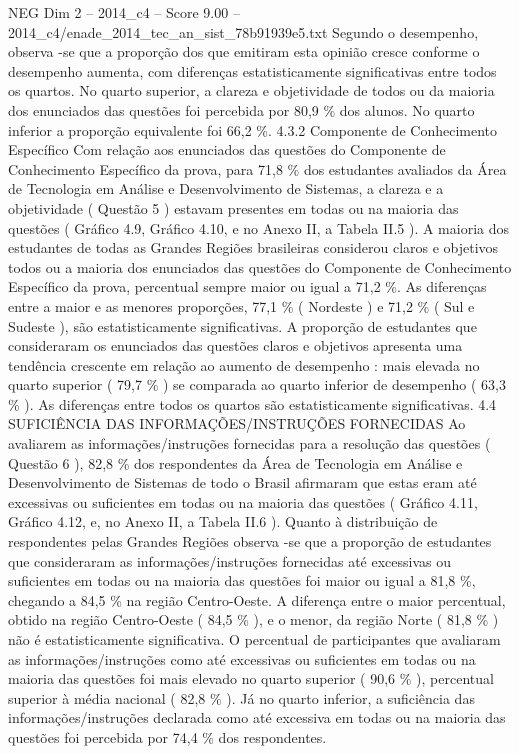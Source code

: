 \begin{textsample}{NEG Dim 2 – 2014\_c4 – Score 9.00 – 2014\_c4/enade\_2014\_tec\_an\_sist\_78b91939e5.txt}
Segundo o desempenho, observa -se que a proporção dos que emitiram esta opinião cresce conforme o desempenho aumenta, com diferenças estatisticamente significativas entre todos os quartos.
No quarto superior, a clareza e objetividade de todos ou da maioria dos enunciados das questões foi percebida por 80,9 \% dos alunos.
No quarto inferior a proporção equivalente foi 66,2 \%. 4.3.2 Componente de Conhecimento Específico Com relação aos enunciados das questões do Componente de Conhecimento Específico da prova, para 71,8 \% dos estudantes avaliados da Área de Tecnologia em Análise e Desenvolvimento de Sistemas, a clareza e a objetividade ( Questão 5 ) estavam presentes em todas ou na maioria das questões ( Gráfico 4.9, Gráfico 4.10, e no Anexo II, a Tabela II.5 ).
A maioria dos estudantes de todas as Grandes Regiões brasileiras considerou claros e objetivos todos ou a maioria dos enunciados das questões do Componente de Conhecimento Específico da prova, percentual sempre maior ou igual a 71,2 \%.
As diferenças entre a maior e as menores proporções, 77,1 \% ( Nordeste ) e 71,2 \% ( Sul e Sudeste ), são estatisticamente significativas.
A proporção de estudantes que consideraram os enunciados das questões claros e objetivos apresenta uma tendência crescente em relação ao aumento de desempenho : mais elevada no quarto superior ( 79,7 \% ) se comparada ao quarto inferior de desempenho ( 63,3 \% ).
As diferenças entre todos os quartos são estatisticamente significativas. 4.4 SUFICIÊNCIA DAS INFORMAÇÕES/INSTRUÇÕES FORNECIDAS Ao avaliarem as informações/instruções fornecidas para a resolução das questões ( Questão 6 ), 82,8 \% dos respondentes da Área de Tecnologia em Análise e Desenvolvimento de Sistemas de todo o Brasil afirmaram que estas eram até excessivas ou suficientes em todas ou na maioria das questões ( Gráfico 4.11, Gráfico 4.12, e, no Anexo II, a Tabela II.6 ).
Quanto à distribuição de respondentes pelas Grandes Regiões observa -se que a proporção de estudantes que consideraram as informações/instruções fornecidas até excessivas ou suficientes em todas ou na maioria das questões foi maior ou igual a 81,8 \%, chegando a 84,5 \% na região Centro-Oeste.
A diferença entre o maior percentual, obtido na região Centro-Oeste ( 84,5 \% ), e o menor, da região Norte ( 81,8 \% ) não é estatisticamente significativa.
O percentual de participantes que avaliaram as informações/instruções como até excessivas ou suficientes em todas ou na maioria das questões foi mais elevado no quarto superior ( 90,6 \% ), percentual superior à média nacional ( 82,8 \% ).
Já no quarto inferior, a suficiência das informações/instruções declarada como até excessiva em todas ou na maioria das questões foi percebida por 74,4 \% dos respondentes.

\end{textsample}
